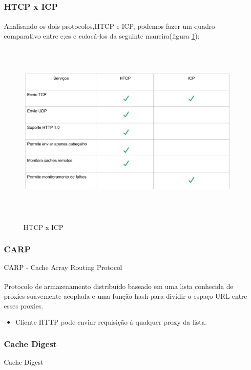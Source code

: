 \subsubsection{HTCP x ICP}
\paragraph{} Analisando os dois protocolos,HTCP e ICP, podemos fazer um quadro comparativo entre e;es e coloc\'a-los da seguinte maneira(figura \ref{figura:htcp_x_icp}):

\begin{figure}[H]
\caption{HTCP x ICP}
\includegraphics[height=9cm]{Figuras/htcp_x_icp.png} 
\label{figura:htcp_x_icp}
\end{figure}

\subsubsection{CARP}
\label{section:CARP}
CARP -  Cache Array Routing Protocol
\paragraph{} Protocolo de armazenamento distribu\'ido baseado em uma lista conhecida de proxies suavemente acoplada e uma fun\c{c}\~ao hash para dividir o espa\c{c}o URL entre esses proxies.
\begin{itemize}
\item Cliente HTTP pode enviar requisi\c{c}\~ao \`a qualquer proxy da lista.
\end{itemize}

\subsubsection{Cache Digest}
\label{section:Cache Digest}
Cache Digest
